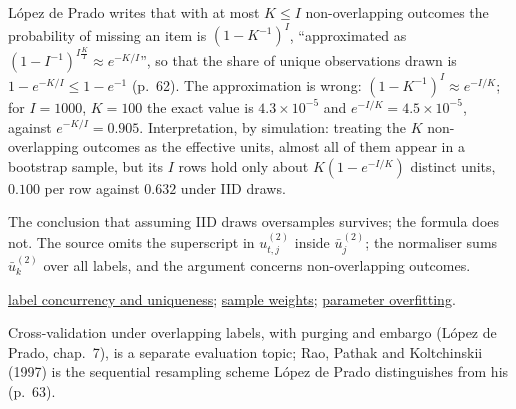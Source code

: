 \begin{qfmethod}
 López de Prado writes that with at most $K\le I$ non-overlapping outcomes the probability of missing an item is $(1-K^{-1})^I$, ``approximated as $(1-I^{-1})^{I\frac{K}{I}}\approx e^{-K/I}$'', so that the share of unique observations drawn is $1-e^{-K/I}\le1-e^{-1}$ (p.~62). The approximation is wrong: $(1-K^{-1})^I\approx e^{-I/K}$; for $I=1000$, $K=100$ the exact value is $4.3\times10^{-5}$ and $e^{-I/K}=4.5\times10^{-5}$, against $e^{-K/I}=0.905$. Interpretation, by simulation: treating the $K$ non-overlapping outcomes as the effective units, almost all of them appear in a bootstrap sample, but its $I$ rows hold only about $K(1-e^{-I/K})$ distinct units, $0.100$ per row against $0.632$ under IID draws.

The conclusion that assuming IID draws oversamples survives; the formula does not. The source omits the superscript in $u^{(2)}_{t,j}$ inside $\bar u^{(2)}_j$; the normaliser sums $\bar u^{(2)}_k$ over all labels, and the argument concerns non-overlapping outcomes.

 \hyperref[def:label-concurrency-uniqueness]{label concurrency and uniqueness}; \hyperref[meth:sample-weights-attribution-decay]{sample weights}; \hyperref[pit:parameter-overfitting]{parameter overfitting}.

 Cross-validation under overlapping labels, with purging and embargo (López de Prado, chap.~7), is a separate evaluation topic; Rao, Pathak and Koltchinskii (1997) is the sequential resampling scheme López de Prado distinguishes from his (p.~63).

\end{qfmethod}

